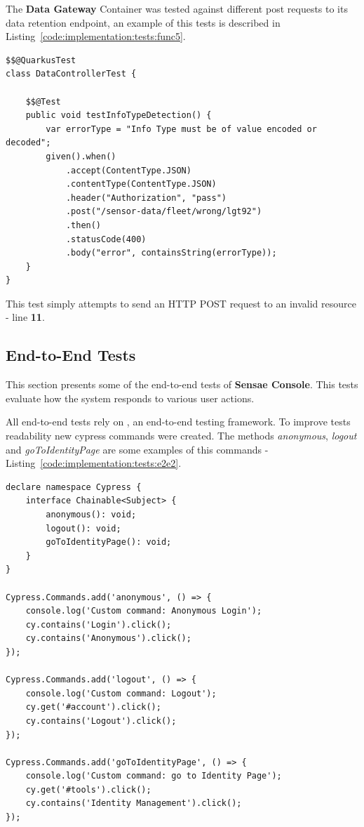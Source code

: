 The \textbf{Data Gateway} Container was tested against different post requests to its data retention endpoint, an example of this tests is described in Listing~\ref{code:implementation:tests:func5}.

\begin{lstlisting}[style=Java, caption=Functional Test - Rest Client Interaction - \textbf{Data Gateway}, label={code:implementation:tests:func5}]
$$@QuarkusTest
class DataControllerTest {

    $$@Test
    public void testInfoTypeDetection() {
        var errorType = "Info Type must be of value encoded or decoded";
        given().when()
            .accept(ContentType.JSON)
            .contentType(ContentType.JSON)
            .header("Authorization", "pass")
            .post("/sensor-data/fleet/wrong/lgt92")
            .then()
            .statusCode(400)
            .body("error", containsString(errorType));
    }
}
\end{lstlisting}

This test simply attempts to send an HTTP POST request to an invalid resource - line \textbf{11}.

\subsection{End-to-End Tests}
\label{subsec:implementation:tests:endtoend}

This section presents some of the end-to-end tests of \textbf{Sensae Console}.
This tests evaluate how the system responds to various user actions.

All end-to-end tests rely on , an end-to-end testing framework.
To improve tests readability new cypress commands were created.
The methods \textit{anonymous}, \textit{logout} and \textit{goToIdentityPage} are some examples of this commands - Listing~\ref{code:implementation:tests:e2e2}.

\begin{lstlisting}[style=javascript, caption=End-to-End Test - Custom Commands - \textbf{UI Aggregator}, label={code:implementation:tests:e2e2}]
declare namespace Cypress {
    interface Chainable<Subject> {
        anonymous(): void;
        logout(): void;
        goToIdentityPage(): void;
    }
}

Cypress.Commands.add('anonymous', () => {
    console.log('Custom command: Anonymous Login');
    cy.contains('Login').click();
    cy.contains('Anonymous').click();
});

Cypress.Commands.add('logout', () => {
    console.log('Custom command: Logout');
    cy.get('#account').click();
    cy.contains('Logout').click();
});

Cypress.Commands.add('goToIdentityPage', () => {
    console.log('Custom command: go to Identity Page');
    cy.get('#tools').click();
    cy.contains('Identity Management').click();
});
\end{lstlisting}

